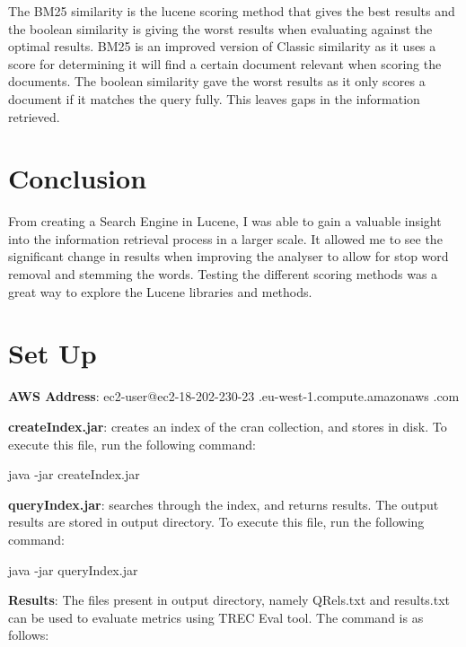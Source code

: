 \newpage	
The BM25 similarity is the lucene scoring method that gives the best results and the boolean similarity is giving the worst results when evaluating against the optimal results.  BM25 is an improved version of Classic similarity as it uses a score for determining it will find a certain document relevant when scoring the documents. The boolean similarity gave the worst results as it only scores a document if it matches the query fully. This leaves gaps in the information retrieved. \par 

\section{Conclusion}
From creating a Search Engine in Lucene, I was able to gain a valuable insight into the information retrieval process in a larger scale. It allowed me to see the significant change in results when improving the analyser to allow for stop word removal and stemming  the words. Testing the different scoring methods was a great way to explore the Lucene libraries and methods.\par 

\section{Set Up}

\textbf{AWS Address}: \newline ec2-user@ec2-18-202-230-23
.eu-west-1.compute.amazonaws \newline .com \newline


\noindent \textbf{createIndex.jar}: creates an index of the cran collection, and stores in disk. To execute this file, run the following command:

\begin{center} 
 java -jar createIndex.jar \newline
\end{center}

\noindent \textbf{queryIndex.jar}: searches through the index, and returns results. The output results are stored in output directory. To execute this file, run the following command:

\begin{center} 
 java -jar queryIndex.jar \newline
\end{center}

\noindent \textbf{Results}: The files present in output directory, namely QRels.txt and results.txt can be used to evaluate metrics using TREC Eval tool. The command is as follows:

